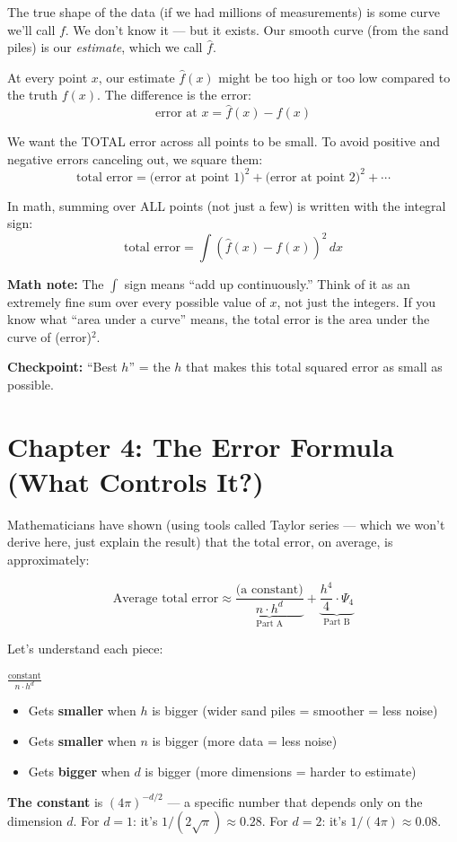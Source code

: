 \documentclass[12pt]{article}
\newcommand{\concept}[2]{\begin{tcolorbox}[colback=blue!3,colframe=blue!40!black,title={#1},breakable]#2\end{tcolorbox}}
\newcommand{\mathnote}[1]{\begin{tcolorbox}[colback=yellow!5,colframe=yellow!60!black,breakable]\textbf{Math note:} #1\end{tcolorbox}}
\newcommand{\checkpoint}[1]{\begin{tcolorbox}[colback=purple!5,colframe=purple!50!black,breakable]\textbf{Checkpoint:} #1\end{tcolorbox}}
\begin{document}
The true shape of the data (if we had millions of measurements) is some curve we'll call $f$. We don't know it --- but it exists. Our smooth curve (from the sand piles) is our \textit{estimate}, which we call $\hat{f}$.

\concept{Error = how far our estimate is from the truth}{
At every point $x$, our estimate $\hat{f}(x)$ might be too high or too low compared to the truth $f(x)$. The difference is the error:
$$\text{error at } x = \hat{f}(x) - f(x)$$
}

We want the TOTAL error across all points to be small. To avoid positive and negative errors canceling out, we square them:
$$\text{total error} = \text{(error at point 1)}^2 + \text{(error at point 2)}^2 + \cdots$$

In math, summing over ALL points (not just a few) is written with the integral sign:
$$\text{total error} = \int (\hat{f}(x) - f(x))^2\, dx$$

\mathnote{The $\int$ sign means ``add up continuously.'' Think of it as an extremely fine sum over every possible value of $x$, not just the integers. If you know what ``area under a curve'' means, the total error is the area under the curve of (error)$^2$.}

\checkpoint{``Best $h$'' = the $h$ that makes this total squared error as small as possible.}

\section{Chapter 4: The Error Formula (What Controls It?)}

Mathematicians have shown (using tools called Taylor series --- which we won't derive here, just explain the result) that the total error, on average, is approximately:

$$\text{Average total error} \approx \underbrace{\frac{\text{(a constant)}}{n \cdot h^d}}_{\text{Part A}} + \underbrace{\frac{h^4}{4} \cdot \Psi_4}_{\text{Part B}}$$

Let's understand each piece:

\concept{Part A: The ``noise'' (variance)}{
$\frac{\text{constant}}{n \cdot h^d}$

\begin{itemize}
\item Gets \textbf{smaller} when $h$ is bigger (wider sand piles = smoother = less noise)
\item Gets \textbf{smaller} when $n$ is bigger (more data = less noise)
\item Gets \textbf{bigger} when $d$ is bigger (more dimensions = harder to estimate)
\end{itemize}

\textbf{The constant} is $(4\pi)^{-d/2}$ --- a specific number that depends only on the dimension $d$. For $d=1$: it's $1/(2\sqrt{\pi}) \approx 0.28$. For $d=2$: it's $1/(4\pi) \approx 0.08$.
}
\end{document}
